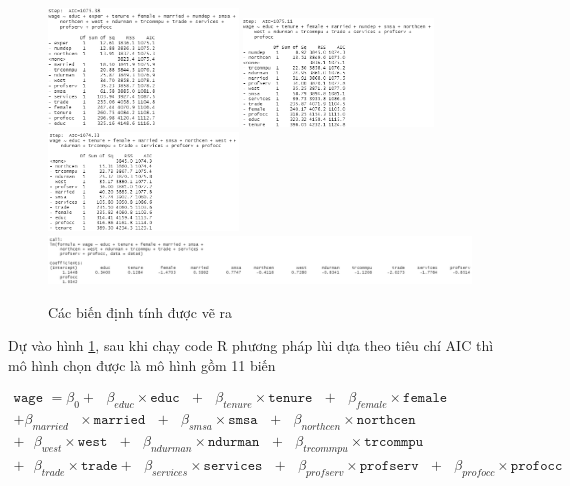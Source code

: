 \begin{figure}[H]
	\includegraphics[width=0.45\textwidth]{../Photo Of Result/stepAIC(4)-6}
	\includegraphics[width=0.45\textwidth]{../Photo Of Result/stepAIC(4)-7}
	\includegraphics[width=0.45\textwidth]{../Photo Of Result/stepAIC(4)-8}
	\includegraphics[width=\textwidth]{../Photo Of Result/stepAIC(4)-9}
	\caption{Các biến định tính được vẽ ra}
	\label{stepAIC}
\end{figure}

Dự vào hình \ref{stepAIC}, sau khi chạy code R phương pháp lùi dựa theo tiêu chí AIC thì mô hình chọn được là mô hình gồm 11 biến

\begin{equation*}
	\begin{multlined}
		\texttt{wage } = \beta_0 + \text{ } \beta_{educ}\times \texttt{educ} \text{ } + \text{ } \beta_{tenure} \times \texttt{tenure} \text{ }+\text{ }\beta_{female} \times \texttt{female} \text{ } \\
		+ \beta_{married} \text{ } \times \texttt{married} \text{ } +\text{ }\beta_{smsa} \times\texttt{smsa}\text{ } +\text{ }\beta_{northcen}\times \texttt{northcen} \\
		+\text{ }\beta_{west} \times \texttt{west} \text{ } + \text{ }\beta_{ndurman}\times \texttt{ndurman}\text{ } +\text{ }\beta_{trcommpu} \times\texttt{trcommpu}\text{ } \\
		+\text{ }\beta_{trade}\times \texttt{trade} +\text{ }\beta_{services} \times \texttt{services} \text{ } 
		+ \text{ }\beta_{profserv} \times \texttt{profserv} \text{ } + \text{ }\beta_{profocc}\times \texttt{profocc}
	\end{multlined}
\end{equation*}


